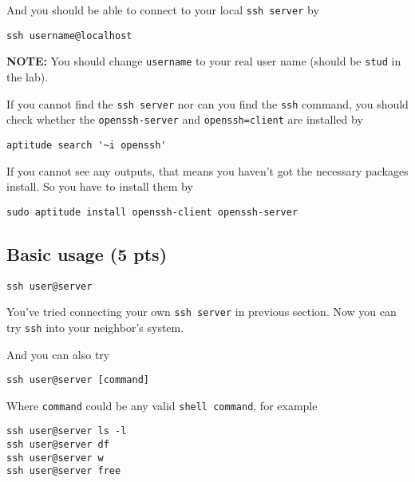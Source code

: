 \documentclass{article} [NO-DEFAULT-PACKAGES] \usepackage{wx672hyperref}
\begin{document}
And you should be able to connect to your local \texttt{ssh server} by
\begin{verbatim}
ssh username@localhost
\end{verbatim}

\textbf{NOTE:} You should change \texttt{username} to your real user name (should be \texttt{stud} in the
lab).

If you cannot find the \texttt{ssh server} nor can you find the \texttt{ssh} command, you should
check whether the \texttt{openssh-server} and \texttt{openssh=client} are installed by
\begin{verbatim}
aptitude search '~i openssh'
\end{verbatim}

If you cannot see any outputs, that means you haven't got the necessary packages
install. So you have to install them by
\begin{verbatim}
sudo aptitude install openssh-client openssh-server
\end{verbatim}

\subsection{Basic usage (5 pts)}
\label{sec:org66cdc48}
\begin{verbatim}
ssh user@server
\end{verbatim}

You've tried connecting your own \texttt{ssh server} in previous section. Now you can try
\texttt{ssh} into your neighbor's system.

And you can also try
\begin{verbatim}
ssh user@server [command]
\end{verbatim}

Where \texttt{command} could be any valid \texttt{shell command}, for example
\begin{verbatim}
ssh user@server ls -l
ssh user@server df
ssh user@server w
ssh user@server free
\end{verbatim}
\end{document}
